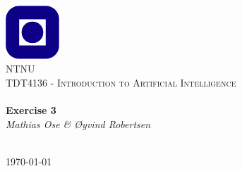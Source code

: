 \begin{titlepage}
\begin{center}
\includegraphics[width=0.15\textwidth]{img/NTNU.png}~\\[1cm]

\textsc{\LARGE NTNU}\\[1.5cm]

\textsc{\Large TDT4136 - Introduction to Artificial Intelligence}\\[0.5cm]

\HRule \\[0.4cm]
{ \huge \bfseries Exercise 3}\\[0.5cm]
{\large \textit{Mathias Ose \& Øyvind Robertsen}}\\[0.2cm]
\HRule \\[1.5cm]



\vfill

{\large \today}
\end{center}
\end{titlepage}
